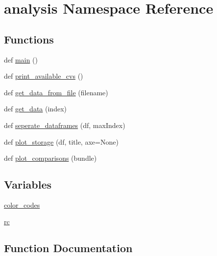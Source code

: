 \hypertarget{namespaceanalysis}{}\section{analysis Namespace Reference}
\label{namespaceanalysis}
\subsection*{Functions}
\begin{DoxyCompactItemize}
\item 
def \hyperlink{namespaceanalysis_a934813823c988db63ba98f300055b998_a934813823c988db63ba98f300055b998}{main} ()
\item 
def \hyperlink{namespaceanalysis_a5f85d3f13b078c21b4e1c2008de0978b_a5f85d3f13b078c21b4e1c2008de0978b}{print\+\_\+available\+\_\+cvs} ()
\item 
def \hyperlink{namespaceanalysis_a5ed46a991cd908a0002b3eba77e3c60f_a5ed46a991cd908a0002b3eba77e3c60f}{get\+\_\+data\+\_\+from\+\_\+file} (filename)
\item 
def \hyperlink{namespaceanalysis_afcb09c4686ae4b01ef3b2746dbf16829_afcb09c4686ae4b01ef3b2746dbf16829}{get\+\_\+data} (index)
\item 
def \hyperlink{namespaceanalysis_a2d283e765d037acc5b1405e3ddc5b5c6_a2d283e765d037acc5b1405e3ddc5b5c6}{seperate\+\_\+dataframes} (df, max\+Index)
\item 
def \hyperlink{namespaceanalysis_aa16091c7d73af16f02820451c7fc0e7b_aa16091c7d73af16f02820451c7fc0e7b}{plot\+\_\+storage} (df, title, axe=None)
\item 
def \hyperlink{namespaceanalysis_a4986d1dad621042c37f83c42ccbd7f57_a4986d1dad621042c37f83c42ccbd7f57}{plot\+\_\+comparisons} (bundle)
\end{DoxyCompactItemize}
\subsection*{Variables}
\begin{DoxyCompactItemize}
\item 
\hyperlink{namespaceanalysis_ae32980bd150e3edd7ee541f8faccc0a5_ae32980bd150e3edd7ee541f8faccc0a5}{color\+\_\+codes}
\item 
\hyperlink{namespaceanalysis_a59b4f943875ddb96a4eb6c650a2f7574_a59b4f943875ddb96a4eb6c650a2f7574}{rc}
\end{DoxyCompactItemize}


\subsection{Function Documentation}
\mbox{\label{namespaceanalysis_afcb09c4686ae4b01ef3b2746dbf16829_afcb09c4686ae4b01ef3b2746dbf16829}} 
